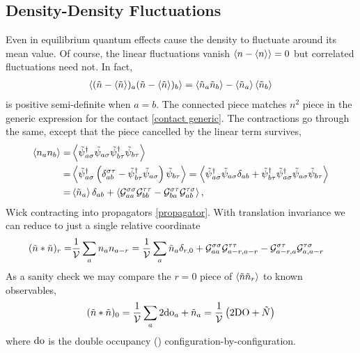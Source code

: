 \subsection{Density-Density Fluctuations}\label{sec:density fluctuations}

Even in equilibrium quantum effects cause the density to fluctuate around its mean value.
Of course, the linear fluctuations vanish $\left\langle n - \left\langle n \right\rangle \right\rangle = 0$ but correlated fluctuations need not.
In fact,
\begin{align}
    \left\langle  (\tilde{n}-\left\langle \tilde{n} \right\rangle)_a (\tilde{n}-\left\langle \tilde{n} \right\rangle)_b  \right\rangle
    =
    \left\langle  \tilde{n}_a \tilde{n}_b  \right\rangle - \left\langle \tilde{n}_a \right\rangle \left\langle \tilde{n}_b \right\rangle
\end{align}
is positive semi-definite when $a=b$.
The connected piece matches $n^2$ piece in the generic expression for the contact \eqref{contact generic}.
The contractions go through the same, except that the piece cancelled by the linear term survives,
\begin{align}
    \left\langle n_a n_b \right\rangle
    =&
    \left\langle 
        \tilde{\psi}{}^{\dagger}_{a\sigma} \tilde{\psi}_{a\sigma} \tilde{\psi}{}^{\dagger}_{b\tau} \tilde{\psi}_{b\tau}
         \right\rangle
    \nonumber\\
    =&
    \left\langle 
        \tilde{\psi}{}^{\dagger}_{a\sigma} \left(\delta_{ab}^{\sigma\tau} - \tilde{\psi}{}^{\dagger}_{b\tau} \tilde{\psi}_{a\sigma}\right) \tilde{\psi}_{b\tau}
         \right\rangle
    =
    \left\langle 
        \tilde{\psi}{}^{\dagger}_{a\sigma} \tilde{\psi}_{a\sigma} \delta_{ab}
    +   \tilde{\psi}{}^{\dagger}_{b\tau} \tilde{\psi}{}^{\dagger}_{a\sigma} \tilde{\psi}_{a\sigma} \tilde{\psi}_{b\tau}
     \right\rangle
    \nonumber\\
    =&
    \left\langle \tilde{n}_a \right\rangle \delta_{ab}
    +
    \left\langle 
        \mathcal{G}^{\sigma\sigma}_{aa} \mathcal{G}^{\tau\tau}_{bb}
    -   \mathcal{G}^{\sigma\tau}_{ba} \mathcal{G}^{\tau\sigma}_{ab}
     \right\rangle,
\end{align}
Wick contracting into propagators \eqref{propagator}.
With translation invariance we can reduce to just a single relative coordinate
\begin{align}
    (\tilde{n}*\tilde{n})_r 
    =&
    \frac{1}{\mathcal{V}} \sum_a n_a n_{a-r}
    =
    \frac{1}{\mathcal{V}} \sum_a \tilde{n}_a \delta_{r,0}
    +   \mathcal{G}^{\sigma\sigma}_{aa} \mathcal{G}^{\tau\tau}_{a-r,a-r}
    -   \mathcal{G}^{\sigma\tau}_{a-r,a} \mathcal{G}^{\tau\sigma}_{a,a-r}
\end{align}
As a sanity check we may compare the $r=0$ piece of $\left\langle \tilde{n}\tilde{n}_r \right\rangle$ to known observables,
\begin{align}
    (\tilde{n}*\tilde{n})_0 = \frac{1}{\mathcal{V}}\sum_a 2 \textrm{do}_a + \tilde{n}_a = \frac{1}{\mathcal{V}}\left( 2 \textrm{DO} + \tilde{N} \right)
\end{align}
where $\textrm{do}$ is the double occupancy () configuration-by-configuration.

